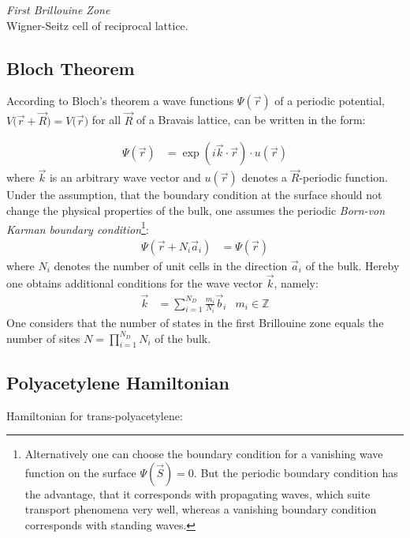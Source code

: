 \emph{First Brillouine Zone}\\
Wigner-Seitz cell of reciprocal lattice.\\

\subsection{Bloch Theorem}
According to Bloch's theorem a wave functions $\Psi(\vec{r})$ of a periodic potential, $V\big(\vec{r} + \vec{R}\big)= V\big(\vec{r}\big)$ for all $\vec{R}$ of a Bravais lattice, can be written in the form:

\begin{align}
	\Psi(\vec{r}) &= \exp\left(i\vec{k}\cdot\vec{r}\right) \cdot u\left(\vec{r}\right)
\end{align}
where $\vec{k}$ is an arbitrary wave vector and $u\left(\vec{r}\right)$ denotes a $\vec{R}$-periodic function.\\
Under the assumption, that the boundary condition at the surface should not change the physical properties of the bulk, one assumes the periodic \emph{Born-von Karman boundary condition}\footnote{Alternatively one can choose the boundary condition  for a vanishing wave function on the surface $\Psi\left(\vec{S}\right) = 0$. But the periodic boundary condition has the advantage, that it corresponds with propagating waves, which suite transport phenomena very well, whereas a vanishing boundary condition corresponds with standing waves.}:
\begin{align}
	\Psi\left(\vec{r} + N_i \vec{a}_i\right) &= \Psi\left(\vec{r}\right)
\end{align}
where $N_i$ denotes the number of unit cells in the direction $\vec{a}_i$ of the bulk. Hereby one obtains additional conditions for the wave vector $\vec{k}$, namely:
\begin{align}
	\vec{k} &= \sum_{i = 1}^{N_D} \frac{m_i}{N_i} \vec{b}_i & m_i \in \mathbb{Z} 
\end{align}
One considers that the number of states in the first Brillouine zone equals the number of sites $N = \prod_{i = 1}^{N_D}N_i$ of the bulk.\\

\newpage
\subsection{Polyacetylene Hamiltonian}
Hamiltonian for trans-polyacetylene:

